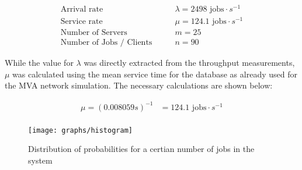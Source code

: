 \documentclass[a4paper, oneside]{csthesis}
\begin{document}
    \begin{align*}
        \text{Arrival rate}  & \qquad \lambda = 2498 \text{ jobs}\cdot s^{-1} \\
        \text{Service rate}  & \qquad \mu = 124.1 \text{ jobs} \cdot s^{-1} \\
        \text{Number of Servers}        & \qquad m       = 25   \\
        \text{Number of Jobs / Clients} & \qquad n       = 90
    \end{align*}

    While the value for $\lambda$ was directly extracted from the throughput
    measurements, $\mu$ was calculated using the mean service time for the
    database as already used for the MVA network simulation. The necessary
    calculations are shown below:

    \begin{align*}
        \mu = (0.008059s)^{-1} &= 124.1 \text{ jobs} \cdot s^{-1} \\
    \end{align*}
    
    \begin{figure}[th]
        \centering
            \texttt{[image: graphs/histogram]}
            \caption{Distribution of probabilities for a certian number of jobs
            in the system}
            \label{fig:jobs-in-queue-db}
    \end{figure}
    
\end{document}
